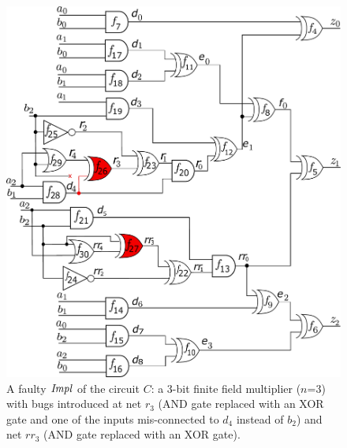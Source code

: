 
\begin{figure}[hbt]
    \begin{center}
    \includegraphics[scale = 0.29]{mas_3_ddc_mfr_a.pdf}
    \end{center}
    \caption{{\footnotesize  
        A faulty ${\it Impl}$ of the circuit $C$: a 3-bit finite
        field multiplier ($n$=3) with bugs introduced at net $r_3$
        (AND gate replaced with an XOR gate and one of the inputs
        mis-connected to $d_4$ instead of $b_2$) and net $rr_3$ (AND gate
        replaced with an XOR gate).}}  
    \label{fig:mas_bug_W}
\end{figure}
